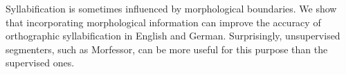 Syllabification is sometimes influenced by morphological boundaries. We show that incorporating morphological information can improve the accuracy of orthographic syllabification in English and German. Surprisingly, unsupervised segmenters, such as Morfessor, can be more useful for this purpose than the supervised ones.
